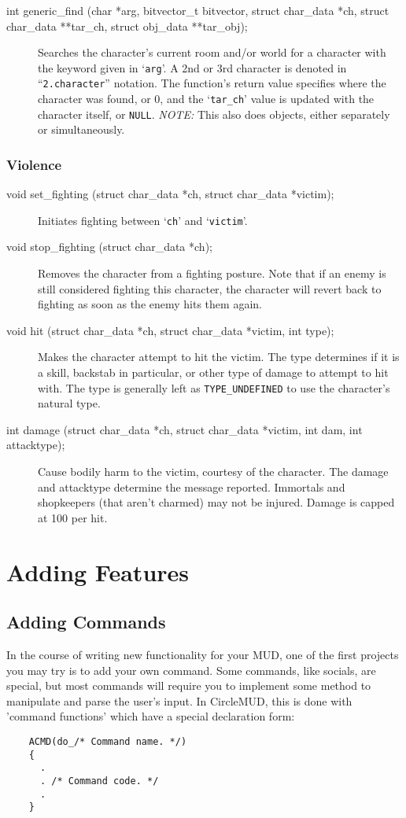 \documentclass[11pt]{article}
\begin{document}
\begin{description}
\item[int generic\_find (char *arg, bitvector\_t bitvector, struct char\_data *ch, struct char\_data **tar\_ch, struct obj\_data **tar\_obj);]
Searches the character's current room and/or world for a character
with the keyword given in `\texttt{arg}'.  A 2nd or 3rd character is denoted
in ``\texttt{2.character}'' notation.  The function's return value specifies
where the character was found, or 0, and the `\texttt{tar\_ch}' value is
updated with the character itself, or \texttt{NULL}. {\em NOTE:} This also does
objects, either separately or simultaneously.
\end{description}

\subsubsection{Violence}
\begin{description}
\item[void set\_fighting (struct char\_data *ch, struct char\_data *victim);]
Initiates fighting between `\texttt{ch}' and `\texttt{victim}'.
\item[void stop\_fighting (struct char\_data *ch);]
Removes the character from a fighting posture.  Note that if an enemy is still considered fighting this character, the character will revert back to fighting as soon as the enemy hits them again.
\item[void hit (struct char\_data *ch, struct char\_data *victim, int type);]
Makes the character attempt to hit the victim.  The type determines if it is a skill, backstab in particular, or other type of damage to attempt to hit with.  The type is generally left as \texttt{TYPE\_UNDEFINED} to use the character's natural type.
\item[int damage (struct char\_data *ch, struct char\_data *victim, int dam, int attacktype);]
Cause bodily harm to the victim, courtesy of the character.  The damage and attacktype determine the message reported.  Immortals and shopkeepers (that aren't charmed) may not be injured.  Damage is capped at 100 per hit.
\end{description}

\section{Adding Features}
\subsection{Adding Commands}
In the course of writing new functionality for your MUD, one of the first projects you may try is to add your own command.  Some commands, like socials, are special, but most commands will require you to implement some method to manipulate and parse the user's input.  In CircleMUD, this is done with 'command functions' which have a special declaration form:
\begin{verbatim}
	ACMD(do_/* Command name. */)
	{
	  .
	  . /* Command code. */
	  .
	}
\end{verbatim}
\end{document}
